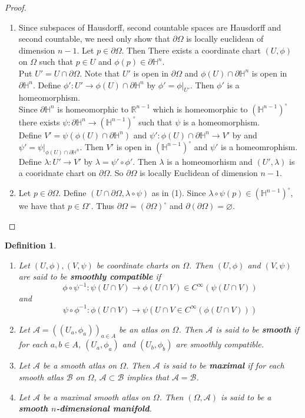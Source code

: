 \documentclass[12pt]{amsart}
\newtheorem{defn}[thm]{Definition}
\newcommand{\lam}{\lambda}
\newcommand{\Om}{\Omega}
\renewcommand{\H}{\mathbb{H}}
\newcommand{\R}{\mathbb{R}}
\newcommand{\MA}{\mathcal{A}}
\newcommand{\MB}{\mathcal{B}}
\begin{document}
	\begin{proof}
		\begin{enumerate}
			\item Since subspaces of Hausdorff, second countable spaces are Hausdorff and second countable, we need only show that $\partial \Om$ is locally euclidean of dimension $n-1$. Let $p \in \partial \Om$. Then There exists a coordinate chart $(U, \phi)$ on $\Om$ such that $p \in U$ and $\phi(p) \in \partial \H^n$. \\
			Put $U' = U \cap \partial \Om$. Note that $U'$ is open in $\partial \Om$ and $ \phi(U) \cap \partial \H^n$ is open in $\partial \H^n$. Define  $\phi': U' \rightarrow \phi(U) \cap \partial \H^n$ by $\phi' = \phi|_{U'}$. Then $\phi'$ is a homeomorphism. \\
			Since $\partial \H^n$ is homeomorphic to $\R^{n-1}$ which is homeomorphic to $(\H^{n-1})^{\circ}$ there exists $\psi: \partial \H^n \rightarrow (\H^{n-1})^{\circ}$ such that $\psi$ is a homeomorphism.\\ 
			Define $V' = \psi(\phi(U) \cap \partial \H^n)$ and $\psi': \phi(U) \cap \partial \H^n \rightarrow V' $ by and $\psi' = \psi|_{\phi(U) \cap \partial \H^n}$. Then $V'$ is open in $(\H^{n-1})^{\circ}$ and $\psi'$ is a homeomrophism. \\ 
			Define $\lam : U' \rightarrow V'$ by $\lam = \psi' \circ \phi'$. Then $\lam$ is a homeomorhism and $(U', \lam) $ is a cooridnate chart on $\partial \Om$. So $\partial \Om$ is locally Euclidean of dimension $n-1$.  
			\item Let $p \in \partial \Om$. Define $(U \cap \partial \Om, \lam \circ \psi)$ as in (1). Since $\lam \circ \psi(p) \in (\H^{n-1})^{\circ}$, we have that $p \in \Om^{\circ}$. Thus $ \partial \Om = (\partial \Om)^{\circ}$ and $\partial (\partial \Om) = \varnothing$.
		\end{enumerate}
	\end{proof}

	\begin{defn}\
		\begin{enumerate}
			\item Let $(U, \phi), (V, \psi)$ be coordinate charts on $\Om$. Then $(U, \phi)$ and $(V, \psi)$ are said to be \textbf{smoothly compatible} if $$\phi \circ \psi^{-1}: \psi(U \cap V) \rightarrow \phi (U \cap V) \in C^{\infty}(\psi(U \cap V))$$ and $$\psi \circ \phi^{-1}: \phi(U \cap V) \rightarrow \psi (U \cap V \in C^{\infty}(\phi(U \cap V)))$$
			\item Let $\MA = ((U_a,\phi_{a}))_{a \in A}$ be an atlas on $\Om$. Then $\MA$ is said to be \textbf{smooth} if for each $a,b \in A$, $(U_a,\phi_{a})$ and $(U_b,\phi_{b})$ are smoothly compatible.
			\item Let $\MA$ be a smooth atlas on $\Om$. Then $\MA$ is said to be \textbf{maximal} if for each smooth atlas $\MB$ on $\Om$, $\MA \subset \MB$ implies that $\MA = \MB$.
			\item Let $\MA$ be a maximal smooth atlas on $\Om$. Then $(\Om, \MA)$ is said to be a \textbf{smooth $n$-dimensional manifold}. 
		\end{enumerate}
	\end{defn}
\end{document}
